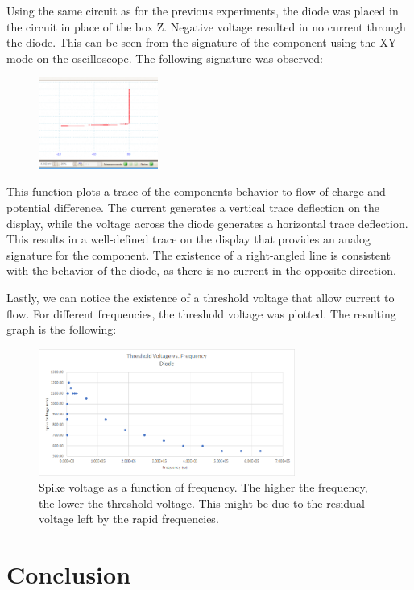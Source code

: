 \documentclass[a4paper]{article}
\begin{document}
Using the same circuit as for the previous experiments, the diode was placed in the circuit in place of the box Z. Negative voltage resulted in no current through the diode. This can be seen from the signature of the component using the XY mode on the oscilloscope. The following signature was observed:
\begin{figure}[h]
\centering
\includegraphics[width=0.35\textwidth]{signature}
\end{figure}

This function plots a trace of the components behavior to flow of charge and potential difference. The current generates a vertical trace deflection on the display, while the voltage across the diode generates a horizontal trace deflection. This results in a well-defined trace on the display that provides an analog signature for the component. The existence of a right-angled line is consistent with the behavior of the diode, as there is no current in the opposite direction.

Lastly, we can notice the existence of a threshold voltage that allow current to flow. For different frequencies, the threshold voltage was plotted. The resulting graph is the following:
\begin{figure}[h]
\centering
\includegraphics[width=0.75\textwidth]{spike}
\caption{Spike voltage as a function of frequency. The higher the frequency, the lower the threshold voltage. This might be due to the residual voltage left by the rapid frequencies.}
\end{figure}
\clearpage
\section{Conclusion}
\end{document}

